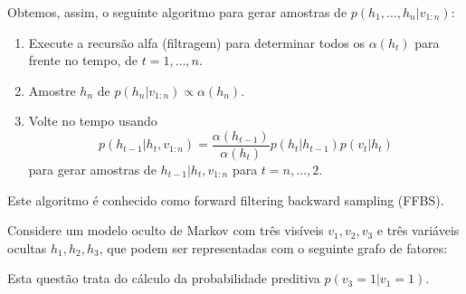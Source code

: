 \begin{exenumerate}
    Obtemos, assim, o seguinte algoritmo para gerar amostras de
    $p(h_1, \ldots, h_n|v_{1:n})$:
    \begin{enumerate}
        \item Execute a recurs\~ao alfa (filtragem) para determinar todos os
        $\alpha(h_t)$ para frente no tempo, de $t=1, \ldots, n$.
        \item Amostre $h_n$ de $p(h_n | v_{1:n}) \propto \alpha(h_n)$.
        \item Volte no tempo usando
        \begin{equation}
            p(h_{t-1}|h_t, v_{1:n}) = \frac{\alpha(h_{t-1})}{\alpha(h_t)} p(h_t|h_{t-1}) p(v_t|h_t)
        \end{equation}
        para gerar amostras de $h_{t-1}|h_t, v_{1:n}$ para $t=n, \ldots, 2$.
    \end{enumerate}
    Este algoritmo \'e conhecido como forward filtering backward sampling (FFBS). 
    
\end{exenumerate}




Considere um modelo oculto de Markov com tr\^es vis\'iveis $v_1, v_2, v_3$
e tr\^es vari\'aveis ocultas $h_1, h_2, h_3$, que podem ser representadas
com o seguinte grafo de fatores:

\begin{center}
\end{center}
Esta quest\~ao trata do c\'alculo da probabilidade preditiva $p(v_3=1 | v_1 =1)$.

